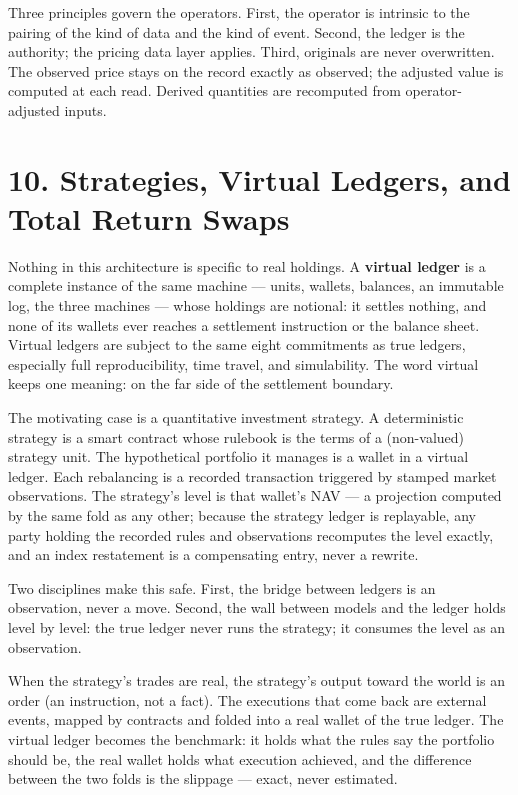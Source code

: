\documentclass[11pt,a4paper]{article}
\newcommand{\clabel}[1]{\leavevmode\hypertarget{clause-#1}{}%
  \marginpar{\raggedright\scriptsize\ttfamily\textcolor{gray}{#1}}}
\begin{document}
\clabel{C-9.3}Three principles govern the operators. First, the operator is intrinsic
to the pairing of the kind of data and the kind of event. Second, the
ledger is the authority; the pricing data layer applies. Third,
originals are never overwritten. The observed price stays on the record
exactly as observed; the adjusted value is computed at each read.
Derived quantities are recomputed from operator-adjusted inputs.

\hypertarget{strategies-virtual-ledgers-and-total-return-swaps}{%
\section{10. Strategies, Virtual Ledgers, and Total Return
Swaps}\label{strategies-virtual-ledgers-and-total-return-swaps}}

Nothing in this architecture is specific to real holdings. \clabel{C-10.1}A
\textbf{virtual ledger} is a complete instance of the same machine ---
units, wallets, balances, an immutable log, the three machines --- whose
holdings are notional: it settles nothing, and none of its wallets ever
reaches a settlement instruction or the balance sheet. Virtual ledgers are subject to the same eight commitments as true ledgers,
especially full reproducibility, time travel, and simulability. The word virtual keeps one meaning: on
the far side of the settlement boundary.

The motivating case is a quantitative investment strategy. \clabel{C-10.2}A
deterministic strategy is a smart contract whose rulebook is the terms
of a (non-valued) strategy unit. The hypothetical portfolio it manages
is a wallet in a virtual ledger. Each rebalancing is a recorded
transaction triggered by stamped market observations. The strategy's
level is that wallet's NAV --- a projection computed by the same fold as
any other; because the strategy ledger is replayable, any party holding
the recorded rules and observations recomputes the level exactly, and an
index restatement is a compensating entry, never a rewrite.

\clabel{C-10.3}Two disciplines make this safe. First, the bridge between ledgers is an
observation, never a move. Second, the wall between models and the
ledger holds level by level: the true ledger never runs the strategy; it
consumes the level as an observation.

\clabel{C-10.4}When the strategy's trades are real, the strategy's output toward the
world is an order (an instruction, not a fact). The executions that come
back are external events, mapped by contracts and folded into a real
wallet of the true ledger. The virtual ledger becomes the benchmark: it
holds what the rules say the portfolio should be, the real wallet holds
what execution achieved, and the difference between the two folds is the
slippage --- exact, never estimated.
\end{document}

